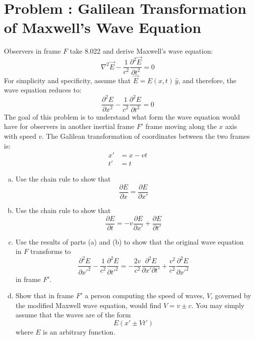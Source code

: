 \documentclass[problems]{esg8022pset}
\begin{document}
\section{Problem \thesection: Galilean Transformation of Maxwell's Wave Equation}
  Observers in frame $F$ take 8.022 and derive Maxwell's wave equation:
  $$\nabla^2\vec{E} - \frac{1}{c^2} \frac{\partial^2\vec{E}}{\partial t^2} = 0$$
  For simplicity and specificity, assume that $\vec{E} = E(x,t)\, \hat{y}$, and therefore, the wave equation reduces to:
  $$\frac{\partial^2E}{\partial x^2} - \frac{1}{c^2} \frac{\partial^2E}{\partial t^2} = 0$$
  The goal of this problem is to understand what form the wave equation would have for observers in another inertial frame $F'$ frame moving along the $x$ axis with speed $v$.  The Galilean transformation of coordinates between the two frames is:
  \begin{align*}
    x' & = x - vt \\
    t' & = t
  \end{align*}

  \begin{enumerate}[(a)]
    \item Use the chain rule to show that
      $$\frac{\partial E}{\partial x} = \frac{\partial E}{\partial x'}$$
    \item Use the chain rule to show that
      $$\frac{\partial E}{\partial t} = -v \frac{\partial E}{\partial x'} + \frac{\partial E}{\partial t'}$$
    \item Use the results of parts (a) and (b) to show that the original wave equation in $F$ transforms to
      $$\frac{\partial^2E}{\partial x'^2} - \frac{1}{c^2} \frac{\partial^2E}{\partial t'^2} = -\frac{2v}{c^2} \frac{\partial^2E}{\partial x' \partial t'} + \frac{v^2}{c^2} \frac{\partial^2E}{\partial x'^2}$$
      in frame $F'$.
    \item Show that in frame $F'$ a person computing the speed of waves, $V$, governed by the modified Maxwell wave equation, would find $V = v \pm c$.  You may simply assume that the waves are of the form
      $$E(x' \pm Vt')$$
      where $E$ is an arbitrary function.
  \end{enumerate}
\end{document}
